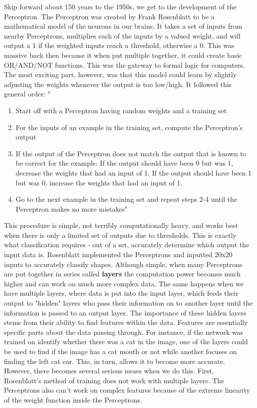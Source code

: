 \documentclass[12pt]{article}
\begin{document}
Skip forward about 150 years to the 1950s, we get to the development of the Perceptron. The Perceptron was created by Frank Rosenblatt to be a mathematical model of the neurons in our brains. It takes a set of inputs from nearby Perceptrons, multiplies each of the inputs by a valued weight, and will output a 1 if the weighted inputs reach a threshold, otherwise a 0. This was massive back then because it when put multiple together, it could create basic OR/AND/NOT functions. This was the gateway to formal logic for computers. The most exciting part, however, was that this model could learn by slightly adjusting the weights whenever the output is too low/high. It followed this general order: "
\begin{enumerate}
\item Start off with a Perceptron having random weights and a training set
\item For the inputs of an example in the training set, compute the Perceptron’s output
\item If the output of the Perceptron does not match the output that is known to be correct for the example: If the output should have been 0 but was 1, decrease the weights that had an input of 1. If the output should have been 1 but was 0, increase the weights that had an input of 1.
\item Go to the next example in the training set and repeat steps 2-4 until the Perceptron makes no more mistakes"
\end{enumerate}

This procedure is simple, not terribly computationally heavy, and works best when there is only a limited set of outputs due to thresholds. This is exactly what classification requires - out of a set, accurately determine which output the input data is. Rosenblatt implemented the Perceptrons and inputted 20x20 inputs to accurately classify shapes. Although simple, when many Perceptrons are put together in series called \textbf{layers} the computation power becomes much higher and can work on much more complex data. The same happens when we have multiple layers, where data is put into the input layer, which feeds their output to "hidden" layers who pass their information on to another layer until the information is passed to an output layer. The importance of these hidden layers stems from their ability to find features within the data. Features are essentially specific parts about the data passing through. For instance, if the network was trained on identify whether there was a cat in the image, one of the layers could be used to find if the image has a cat mouth or not while another focuses on finding the left cat ear. This, in turn, allows it to become more accurate. However, there becomes several serious issues when we do this. First, Rosenblatt's method of training does not work with multiple layers. The Perceptrons also can't work on complex features because of the extreme linearity of the weight function inside the Perceptrons. 
\end{document}
